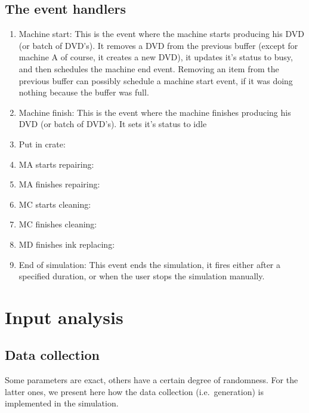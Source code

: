\documentclass{article}
\begin{document}
\subsection{The event handlers}
\begin{enumerate}
    \item Machine start:
        This is the event where the machine starts producing his DVD (or batch of DVD's).
        It removes a DVD from the previous buffer (except for machine A of course, it creates a new DVD), it updates it's status to busy, and then schedules the machine end event.
        Removing an item from the previous buffer can possibly schedule a machine start event, if it was doing nothing because the buffer was full.
    \item Machine finish:
        This is the event where the machine finishes producing his DVD (or batch of DVD's).
        It sets it's status to idle

    \item Put in crate:

    \item MA starts repairing:
    \item MA finishes repairing:
    \item MC starts cleaning:
    \item MC finishes cleaning:
    \item MD finishes ink replacing:

    \item End of simulation:
        This event ends the simulation, it fires either after a specified duration, or when the user stops the simulation manually.
        
\end{enumerate}


\section{Input analysis}

\subsection{Data collection}
Some parameters are exact, others have a certain degree of randomness.
For the latter ones, we present here how the data collection (i.e.\ generation) is implemented in the simulation.
\end{document}
